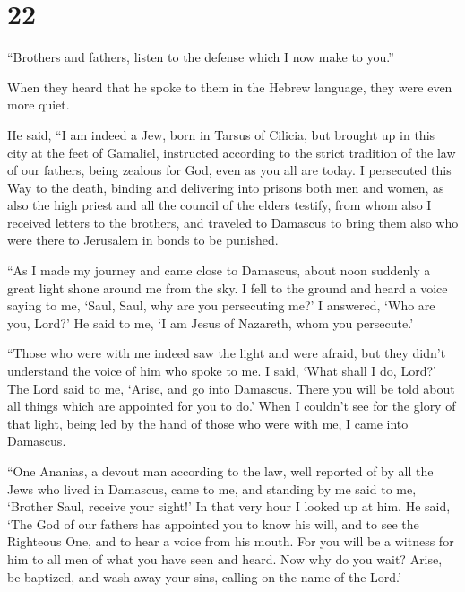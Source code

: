 \hypertarget{section-21}{%
\section{22}\label{section-21}}

 ``Brothers and fathers, listen to the defense which I now
make to you.''

 When they heard that he spoke to them in the Hebrew
language, they were even more quiet.

He said,  ``I am indeed a Jew, born in Tarsus of Cilicia,
but brought up in this city at the feet of Gamaliel, instructed
according to the strict tradition of the law of our fathers, being
zealous for God, even as you all are today.  I persecuted
this Way to the death, binding and delivering into prisons both men and
women,  as also the high priest and all the council of the
elders testify, from whom also I received letters to the brothers, and
traveled to Damascus to bring them also who were there to Jerusalem in
bonds to be punished.

 ``As I made my journey and came close to Damascus, about
noon suddenly a great light shone around me from the sky. 
I fell to the ground and heard a voice saying to me, `Saul, Saul, why
are you persecuting me?'  I answered, `Who are you, Lord?'
He said to me, `I am Jesus of Nazareth, whom you persecute.'

 ``Those who were with me indeed saw the light and were
afraid, but they didn't understand the voice of him who spoke to me.
 I said, `What shall I do, Lord?' The Lord said to me,
`Arise, and go into Damascus. There you will be told about all things
which are appointed for you to do.'  When I couldn't see
for the glory of that light, being led by the hand of those who were
with me, I came into Damascus.

 ``One Ananias, a devout man according to the law, well
reported of by all the Jews who lived in Damascus,  came
to me, and standing by me said to me, `Brother Saul, receive your
sight!' In that very hour I looked up at him.  He said,
`The God of our fathers has appointed you to know his will, and to see
the Righteous One, and to hear a voice from his mouth. 
For you will be a witness for him to all men of what you have seen and
heard.  Now why do you wait? Arise, be baptized, and wash
away your sins, calling on the name of the Lord.'

